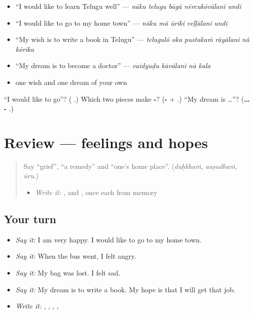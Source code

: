 \begin{itemize}
\raggedright
  \item \textquotedblleft{}I would like to learn Telugu well\textquotedblright{} — \emph{nāku telugu bāgā nērcukōvālani undi}
  \item \textquotedblleft{}I would like to go to my home town\textquotedblright{} — \emph{nāku mā ūriki veḷḷālani undi}
  \item \textquotedblleft{}My wish is to write a book in Telugu\textquotedblright{} — \emph{telugulō oka pustakaṁ rāyālani nā kōrika}
  \item \textquotedblleft{}My dream is to become a doctor\textquotedblright{} — \emph{vaidyuḍu kāvālani nā kala}
  \item one wish and one dream of your own
\end{itemize}

\begin{tcolorbox}[breakable,colback=teal!4,colframe=teal!35!black,title={Before you move on}]
\textquotedblleft{}I would like to go\textquotedblright{}? (\textbf{  }.) Which two pieces make \textbf{-}? (\textbf{-} + \textbf{}.) \textquotedblleft{}My dream is …\textquotedblright{}? (\textbf{… -  }.)
\end{tcolorbox}
\section[(review)]{Review — feelings and hopes}

\label{lesson:TE-R322-feelings-and-hopes}



\begin{quote}
Say \textquotedblleft{}grief\textquotedblright{}, \textquotedblleft{}a remedy\textquotedblright{} and \textquotedblleft{}one's home place\textquotedblright{}. (\emph{duḥkhaṁ}, \emph{auṣadhaṁ}, \emph{ūru}.)

\begin{itemize}
\raggedright
  \item \emph{Write it:} \textbf{}, \textbf{} and \textbf{}, once each from memory
\end{itemize}
\end{quote}

\subsection*{Your turn}
\begin{itemize}
\raggedright
  \item \emph{Say it:} I am very happy. I would like to go to my home town.
  \item \emph{Say it:} When the bus went, I felt angry.
  \item \emph{Say it:} My bag was lost. I felt sad.
  \item \emph{Say it:} My dream is to write a book. My hope is that I will get that job.
  \item \emph{Write it:} \textbf{}, \textbf{}, \textbf{}, \textbf{}, \textbf{}
\end{itemize}

